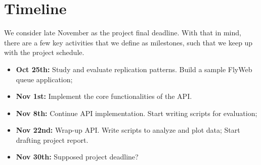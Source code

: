 \section{Timeline}
\label{sec:timeline}

We consider late November as the project final deadline. With that in mind, there are a few key activities that we define as milestones, such that we keep up with the project schedule.

\begin{itemize}
    \item {\bf Oct 25th: } Study and evaluate replication patterns. Build a sample FlyWeb queue application;
    \item {\bf Nov 1st: } Implement the core functionalities of the \APIName{} API.
    \item {\bf Nov 8th: } Continue API implementation. Start writing scripts for evaluation;
    \item {\bf Nov 22nd: } Wrap-up API. Write scripts to analyze and plot data; Start drafting project report.
    \item {\bf Nov 30th: } Supposed project deadline?
\end{itemize}